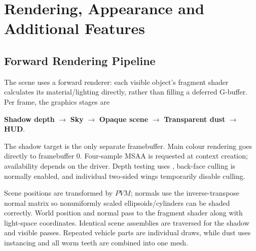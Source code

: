 \clearpage
\section{Rendering, Appearance and Additional Features}
\subsection{Forward Rendering Pipeline}
The scene uses a forward renderer: each visible object's fragment shader calculates its material/lighting directly, rather than filling a deferred G-buffer. Per frame, the graphics stages are
\begin{center}
\textbf{Shadow depth} $\longrightarrow$ \textbf{Sky} $\longrightarrow$ \textbf{Opaque scene}
$\longrightarrow$ \textbf{Transparent dust} $\longrightarrow$ \textbf{HUD}.
\end{center}
The shadow target is the only separate framebuffer. Main colour rendering goes directly to framebuffer 0. Four-sample MSAA is requested at context creation; availability depends on the driver. Depth testing uses , back-face culling is normally enabled, and individual two-sided wings temporarily disable culling.

Scene positions are transformed by $PVM$; normals use the inverse-transpose normal matrix so nonuniformly scaled ellipsoids/cylinders can be shaded correctly. World position and normal pass to the fragment shader along with light-space coordinates. Identical scene assemblies are traversed for the shadow and visible passes. Repeated vehicle parts are individual draws, while dust uses instancing and all worm teeth are combined into one mesh.

